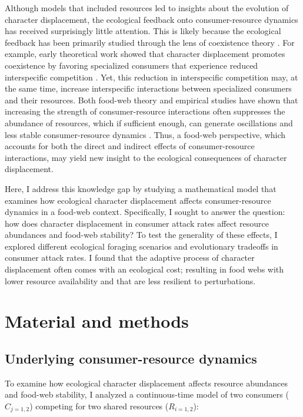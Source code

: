 \documentclass[11pt,]{article}
\begin{document}
Although models that included resources led to insights about the
evolution of character displacement, the ecological feedback onto
consumer-resource dynamics has received surprisingly little attention.
This is likely because the ecological feedback has been primarily
studied through the lens of coexistence theory
\citep{Lawlor1976, Germain2018, Bassar2017, McPeek2019}. For example,
early theoretical work showed that character displacement promotes
coexistence by favoring specialized consumers that experience reduced
interspecific competition \citep{Lawlor1976}. Yet, this reduction in
interspecific competition may, at the same time, increase interspecific
interactions between specialized consumers and their resources. Both
food-web theory and empirical studies have shown that increasing the
strength of consumer-resource interactions often suppresses the
abundance of resources, which if sufficient enough, can generate
oscillations and less stable consumer-resource dynamics
\citep{Rosenzweig1971, Luckinbill1973, Murdoch2002, Murdoch2003, McCann2011}.
Thus, a food-web perspective, which accounts for both the direct and
indirect effects of consumer-resource interactions, may yield new
insight to the ecological consequences of character displacement.

Here, I address this knowledge gap by studying a mathematical model that
examines how ecological character displacement affects consumer-resource
dynamics in a food-web context. Specifically, I sought to answer the
question: how does character displacement in consumer attack rates
affect resource abundances and food-web stability? To test the
generality of these effects, I explored different ecological foraging
scenarios and evolutionary tradeoffs in consumer attack rates. I found
that the adaptive process of character displacement often comes with an
ecological cost; resulting in food webs with lower resource availability
and that are less resilient to perturbations.

\section{Material and methods}\label{material-and-methods}

\subsection{Underlying consumer-resource
dynamics}\label{underlying-consumer-resource-dynamics}

To examine how ecological character displacement affects resource
abundances and food-web stability, I analyzed a continuous-time model of
two consumers (\(C_{j=1,2}\)) competing for two shared resources
(\(R_{i=1,2}\)):
\end{document}
